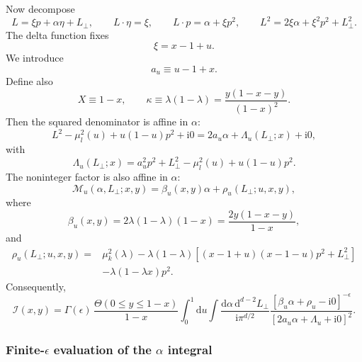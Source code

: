 \documentclass[11pt]{article}
\newcommand{\dd}{\mathrm d}
\newcommand{\ii}{\mathrm i}
\begin{document}
Now decompose
\begin{equation}
L=\xi p+\alpha\eta+L_\perp,
\qquad
L\!\cdot\!\eta=\xi,
\qquad
L\!\cdot p=\alpha+\xi p^2,
\qquad
L^2=2\xi\alpha+\xi^2p^2+L_\perp^2.
\label{eq:method2-L-lightcone}
\end{equation}
The delta function fixes
\begin{equation}
\xi=x-1+u.
\label{eq:method2-xi-fixed}
\end{equation}
We introduce
\begin{equation}
a_u\equiv u-1+x.
\label{eq:audef}
\end{equation}
Define also
\begin{equation}
X\equiv 1-x,
\qquad
\kappa\equiv\lambda(1-\lambda)=\frac{y(1-x-y)}{(1-x)^2}.
\label{eq:X-kappa-def}
\end{equation}
Then the squared denominator is affine in $\alpha$:
\begin{equation}
L^2-\mu_l^2(u)+u(1-u)p^2+\ii0
=2a_u\alpha+\Lambda_u(L_\perp;x)+\ii0,
\label{eq:quadalpha}
\end{equation}
with
\begin{equation}
\Lambda_u(L_\perp;x)=a_u^2p^2+L_\perp^2-\mu_l^2(u)+u(1-u)p^2.
\label{eq:Lambdau}
\end{equation}
The noninteger factor is also affine in $\alpha$:
\begin{equation}
\mathcal M_u(\alpha,L_\perp;x,y)=\beta_u(x,y)\alpha+\rho_u(L_\perp;u,x,y),
\label{eq:Muaffine}
\end{equation}
where
\begin{equation}
\beta_u(x,y)=2\lambda(1-\lambda)(1-x)=\frac{2y(1-x-y)}{1-x},
\label{eq:betau}
\end{equation}
and
\begin{align}
\rho_u(L_\perp;u,x,y)
={}&
\mu_k^2(\lambda)
-\lambda(1-\lambda)\left[(x-1+u)(x-1-u)p^2+L_\perp^2\right]
\nonumber\\
&
-\lambda(1-\lambda x)p^2.
\label{eq:rhou}
\end{align}
Consequently,
\begin{equation}
\mathcal I(x,y)=
\Gamma(\epsilon)\,
\frac{\Theta(0\leq y\leq 1-x)}{1-x}
\int_0^1 \dd u
\int \frac{\dd\alpha\,\dd^{d-2}L_\perp}{\ii\pi^{d/2}}
\frac{[\beta_u\alpha+\rho_u-\ii0]^{-\epsilon}}
{[2a_u\alpha+\Lambda_u+\ii0]^2}.
\label{eq:Ialpha}
\end{equation}



\subsubsection{Finite-$\epsilon$ evaluation of the $\alpha$ integral}
\end{document}
